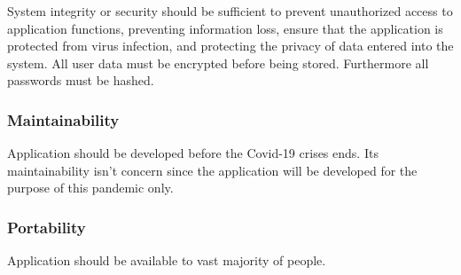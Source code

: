
System integrity or security should be sufficient to prevent unauthorized access to application functions, preventing information loss, ensure that the application is protected from virus infection, and protecting the privacy of data entered into the system. All user data must be encrypted before being stored. Furthermore all passwords must be hashed.

\subsubsection{Maintainability}


Application should be developed before the Covid-19 crises ends. Its maintainability isn't concern since the application will be developed for the purpose of this pandemic only.

\subsubsection{Portability}


Application should be available to vast majority of people.
